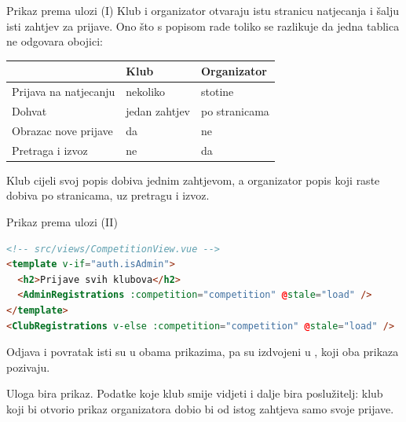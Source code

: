 \begin{frame}{Prikaz prema ulozi (I)}
Klub i organizator otvaraju istu stranicu natjecanja i šalju isti zahtjev za prijave. Ono što s popisom rade toliko se razlikuje da jedna tablica ne odgovara obojici:

\vspace{0.5em}
\begin{center}
{\small
\setlength{\tabcolsep}{6pt}
\renewcommand{\arraystretch}{1.25}
\begin{tabular}{@{}L{3.4cm}L{3.6cm}L{3.6cm}@{}}
  \toprule
   & \textbf{Klub} & \textbf{Organizator} \\
  \midrule
  Prijava na natjecanju & nekoliko & stotine \\
  Dohvat & jedan zahtjev & po stranicama \\
  Obrazac nove prijave & da & ne \\
  Pretraga i izvoz & ne & da \\
  \bottomrule
\end{tabular}
}
\end{center}

\vspace{0.6em}
Klub cijeli svoj popis dobiva jednim zahtjevom, a organizator popis koji raste dobiva po stranicama, uz pretragu i izvoz.
\end{frame}

\begin{frame}[fragile]{Prikaz prema ulozi (II)}
\begin{lstlisting}[language=html]
<!-- src/views/CompetitionView.vue -->
<template v-if="auth.isAdmin">
  <h2>Prijave svih klubova</h2>
  <AdminRegistrations :competition="competition" @stale="load" />
</template>
<ClubRegistrations v-else :competition="competition" @stale="load" />
\end{lstlisting}

\vspace{0.3em}
Odjava i povratak isti su u obama prikazima, pa su izdvojeni u , koji oba prikaza pozivaju.

\vspace{0.3em}
Uloga bira prikaz. Podatke koje klub smije vidjeti i dalje bira poslužitelj: klub koji bi otvorio prikaz organizatora dobio bi od istog zahtjeva samo svoje prijave.
\end{frame}

